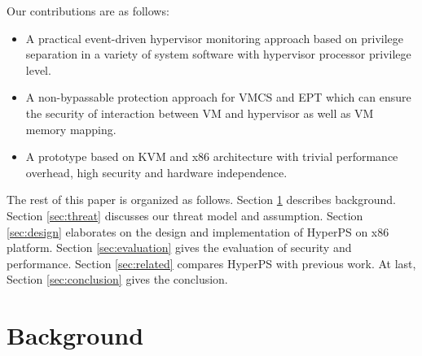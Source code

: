﻿\documentclass[conference]{IEEEtran}
\begin{document}
Our contributions are as follows:
\begin{itemize}



\item{A practical event-driven hypervisor monitoring approach based on privilege separation in a variety of system software with hypervisor processor privilege level.}%
\item{A non-bypassable protection approach for VMCS and EPT which can ensure the security of interaction between VM and hypervisor as well as VM memory mapping.}
\item{A prototype based on KVM and x86 architecture with trivial performance overhead, high security and hardware independence.}%
\end{itemize}

The rest of this paper is organized as follows. Section \ref{background} describes background. Section \ref{sec:threat} discusses our threat model and assumption. Section \ref{sec:design} elaborates on the design and implementation of HyperPS on x86 platform. Section \ref{sec:evaluation} gives the evaluation of security and performance. Section \ref{sec:related} compares HyperPS with previous work. At last, Section \ref{sec:conclusion} gives the conclusion.

%
%
%
%
%


\section{Background}\label{background}
\end{document}
